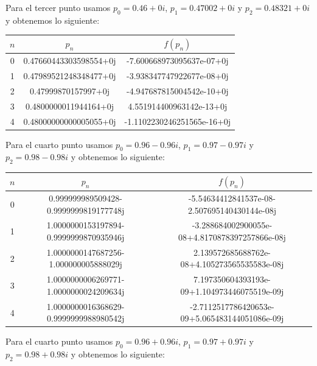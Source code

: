 \documentclass{article}
\begin{document}
Para el tercer punto usamos $p_0 = 0.46 + 0i$, $p_1 = 0.47002 + 0i$ y $p_2 = 0.48321 + 0i$ y obtenemos lo siguiente:

\begin{center}
    \begin{tabular}{||c c c||} 
    \hline
    $n$ & $p_{n}$ & $f(p_n)$ \\ [0.5ex] 
    \hline
    0 & 0.47660443303598554+0j & -7.600668973095637e-07+0j\\
    \hline
    1 & 0.47989521248348477+0j & -3.938347747922677e-08+0j \\
    \hline
    2 & 0.47999870157997+0j & -4.947687815004542e-10+0j \\
    \hline
    3 & 0.4800000011944164+0j & 4.551914400963142e-13+0j \\ 
    \hline
    4 & 0.48000000000005055+0j & -1.1102230246251565e-16+0j \\ [1ex]
    \hline
   \end{tabular}
\end{center}

Para el cuarto punto usamos $p_0 = 0.96 - 0.96i$, $p_1 = 0.97 - 0.97i$ y $p_2 = 0.98 - 0.98i$ y obtenemos lo siguiente:

\begin{center}
    \begin{tabular}{||c c c||} 
    \hline
    $n$ & $p_{n}$ & $f(p_n)$ \\ [0.5ex] 
    \hline
    0 & 0.999999989509428-0.9999999819177748j & -5.54634412841537e-08-2.507695140430144e-08j\\
    \hline
    1 & 1.0000000153197894-0.9999999870935946j& -3.288684002900055e-08+4.8170878397257866e-08j\\
    \hline
    2 & 1.0000000147687256-1.000000005888029j & 2.139572685688762e-08+4.105273565535583e-08j \\
    \hline
    3 & 1.0000000006269771-1.0000000024209634j & 7.197350604393193e-09+1.104973446075519e-09j \\ 
    \hline
    4 & 1.0000000016368629-0.9999999988980542j& -2.7112517786420653e-09+5.065483144051086e-09j \\ [1ex]
    \hline
   \end{tabular}
\end{center}


Para el cuarto punto usamos $p_0 = 0.96 + 0.96i$, $p_1 = 0.97 + 0.97i$ y $p_2 = 0.98 + 0.98i$ y obtenemos lo siguiente:
\end{document}
